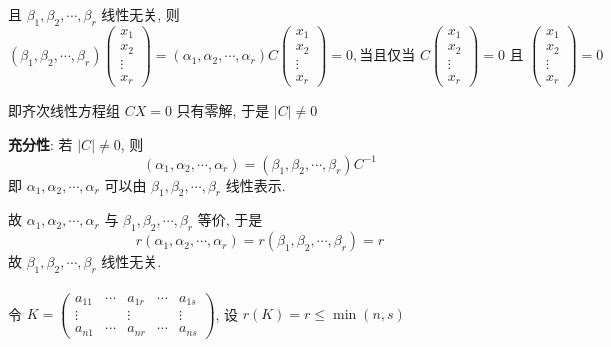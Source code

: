 		 且 \( \beta_{1}, \beta_{2}, \cdots, \beta_{r} \) 线性无关, 则
		 \[
			 (\beta_{1}, \beta_{2}, \cdots, \beta_{r})\begin{pmatrix} x_{1} \\ x_{2} \\ \vdots \\ x_{r} \end{pmatrix} = (\alpha_{1}, \alpha_{2}, \cdots, \alpha_{r})C\begin{pmatrix} x_{1} \\ x_{2} \\ \vdots \\ x_{r} \end{pmatrix} = 0, \text{当且仅当 } C\begin{pmatrix} x_{1} \\ x_{2} \\ \vdots \\ x_{r} \end{pmatrix} = 0  \text{ 且 } \begin{pmatrix} x_{1} \\ x_{2} \\ \vdots \\ x_{r} \end{pmatrix} = 0 \]

		 即齐次线性方程组 \( CX=0 \) 只有零解, 于是 \( |C| \neq 0 \)

		 \textbf{充分性}: 若 \( |C| \neq 0 \), 则
		 \[
			 (\alpha_{1}, \alpha_{2}, \cdots, \alpha_{r}) = (\beta_{1}, \beta_{2}, \cdots, \beta_{r})C^{-1}
		 \]
		 即 \( \alpha_{1}, \alpha_{2}, \cdots, \alpha_{r} \) 可以由 \( \beta_{1}, \beta_{2}, \cdots, \beta_{r} \) 线性表示.

		 故 \( \alpha_{1}, \alpha_{2}, \cdots, \alpha_{r} \) 与 \( \beta_{1}, \beta_{2}, \cdots, \beta_{r} \) 等价, 于是
		 \[
			 r(\alpha_{1}, \alpha_{2}, \cdots, \alpha_{r}) = r(\beta_{1}, \beta_{2}, \cdots, \beta_{r}) = r
		 \]
		 故 \( \beta_{1}, \beta_{2}, \cdots, \beta_{r} \) 线性无关.


	 \paragraph{} %
		 令 \( K = \begin{pmatrix} a_{11} & \cdots & a_{1r} & \cdots & a_{1s} \\ \vdots & & \vdots & & \vdots \\ a_{n1} & \cdots & a_{nr} & \cdots & a_{ns} \end{pmatrix} \), 设 \( r(K) = r \leq \min(n,s) \)

